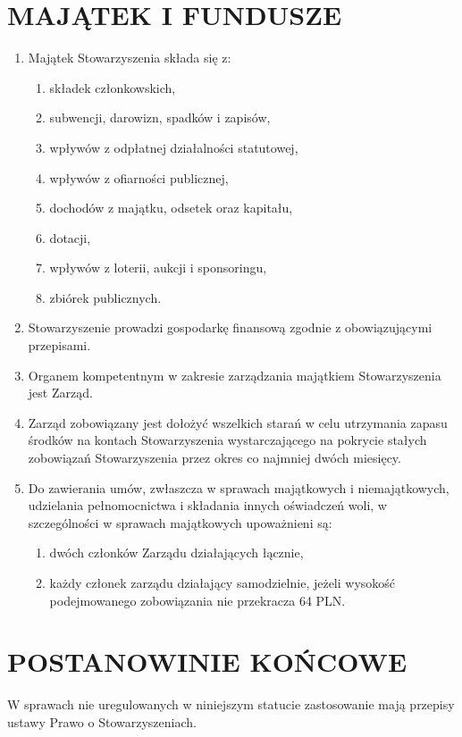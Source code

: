 \documentclass{article}
\begin{document}
\section{MAJĄTEK I FUNDUSZE}
  \begin{enumerate}
    \item Majątek Stowarzyszenia składa się z:
      \begin{enumerate}
        \item składek członkowskich,
        \item subwencji, darowizn, spadków i zapisów,
        \item wpływów z odpłatnej działalności statutowej,
        \item wpływów z ofiarności publicznej,
        \item dochodów z majątku, odsetek oraz kapitału,
        \item dotacji,
        \item wpływów z loterii, aukcji i sponsoringu,
        \item zbiórek publicznych.
      \end{enumerate}
    \item Stowarzyszenie prowadzi gospodarkę finansową zgodnie z obowiązującymi przepisami.
    \item Organem kompetentnym w zakresie zarządzania majątkiem Stowarzyszenia jest Zarząd.
    \item Zarząd zobowiązany jest dołożyć wszelkich starań w celu utrzymania zapasu środków na kontach Stowarzyszenia wystarczającego na pokrycie stałych zobowiązań Stowarzyszenia przez okres co najmniej dwóch miesięcy.
    \item Do zawierania umów, zwłaszcza w sprawach majątkowych i niemajątkowych, udzielania pełnomocnictwa i składania innych oświadczeń woli, w szczególności w sprawach majątkowych upoważnieni są:
      \begin{enumerate}
        \item dwóch członków Zarządu działających łącznie,
        \item każdy członek zarządu działający samodzielnie, jeżeli wysokość podejmowanego zobowiązania nie przekracza 64 PLN.
      \end{enumerate}
  \end{enumerate}
\section{POSTANOWINIE KOŃCOWE}
  W sprawach nie uregulowanych w niniejszym statucie zastosowanie mają przepisy ustawy Prawo o Stowarzyszeniach.
\end{document}
